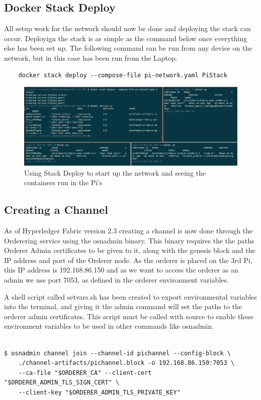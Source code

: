 \subsection{Docker Stack Deploy}

All setup work for the network should now be done and deploying the stack can occur. Deployign the stack is as simple as the command below once everything else has been set up. The following command can be run from any device on the network, but in this case has been run from the Laptop.

\begin{verbatim}
    docker stack deploy --compose-file pi-network.yaml PiStack
\end{verbatim}

\begin{figure}
    \centering
    \includegraphics[width=1.2\columnwidth]{images/stackdeply.PNG}
    \caption{Using Stack Deploy to start up the network and seeing the containers run in the Pi's}
    \label{fig:my_label}
\end{figure}



\subsection{Creating a Channel}

As of Hyperledger Fabric version 2.3  creating a channel is now done through the Orderering service using the osnadmin binary. This binary requires the the paths Orderer Admin certificates to be given to it, along with the genesis block and the IP address and port of the Orderer node. As the orderer is placed on the 3rd Pi, this IP address is 192.168.86.150 and as we want to access the orderer as an admin we use port 7053, as defined in the orderer environment variables.

A shell script called setvars.sh has been created to export environmental variables into the terminal, and giving it the admin command will set the paths to the orderer admin certificates. This script must be called with source to enable these environment variables to be used in other commands like osnadmin.
\begin{verbatim}
    
$ osnadmin channel join --channel-id pichannel --config-block \ 
    ./channel-artifacts/pichannel.block -o 192.168.86.150:7053 \ 
    --ca-file "$ORDERER_CA" --client-cert "$ORDERER_ADMIN_TLS_SIGN_CERT" \ 
    --client-key "$ORDERER_ADMIN_TLS_PRIVATE_KEY"
\end{verbatim}

